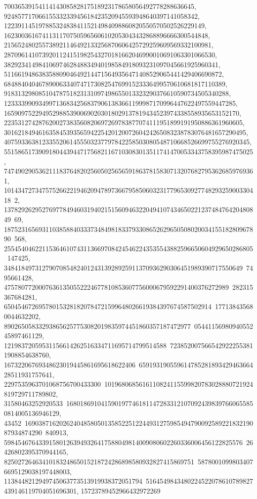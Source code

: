 {{{   7003653915411414308582817518923178658056492778288636645, 
   92485771706615533233945618423520945593948640397141058342, 
   1223911451978853248384115214984098860820550570502526229149, 
   16230036167411311707505965606102053043432868896666300544848, 
   215652480255738921146492133256870606425729259609569332100981, 
   2870961410739201124151982543270181662046990010691063301066530, 
   38292341498410697462848834940198584918093231097045661925960341, 
   511661948638358809046492144715649356471408529065441429406690872, 
   6848840404678900633407471730825476991523336499570610681817110389, 
   91831329808510478751823131097498655013323290376610590734505340288, 
   1233339909349971368342568379061383661199987170996447622497559447285, 
   16590975229495298853900690203018029137819434523974338558935653152170, 
   223531274287620027383560820697269783877074111951899191950886361960605, 
   3016218494616358453935659422542012007260424265083238783076481657290495, 
   40759336381233552061455503237797842258503080548710668526699755276920345, 
   551586517390918044394471756821167103083013511741470053343758395987475025, 
   7474902905362111837648202560502565659186378158307132076827953626859769361, 
   10143472734757526622194620947897366795850603231779653092774829325900330418\
2, 
   13782926295276977849460319402151560946322049410743465022123748476420480849\
69, 
   18752316569311038588403337348498183379330865262965050802003415518280967890\
568, 255454046221153646107431136697084245462243535543882596650604929650286805\
147425, 348418497312790708548240124313928925911370936290306451989390717550649\
7495661428, 47578077200076361350552224677810853607756000679592291400376272989\
282315367684281, 650454672695780153281820784721599648026619384397674587502914\
177138435680044632202, 890265058332938656257753082019835974451860357187472977\
0544115698094055245897461129, 12198372059531156614262516334711695714799514588\
7238520075665429222553811908854638760, 16732206769348623019445861695618622406\
65919319055961478528189342946366428511931757641, 2297535963701068756700433300\
1019680685616110824115599820783028880721924819729711789802, 31580463252920533\
1680186910415901977461811472833121070924398397660655850814005136946129, 43452\
16903871620262404858050135852251224493127598549479009258922183219087934874290\
840913, 598454676433915801263949326417588049814009080602260336006456122825576\
26426802395370944165, 8250272646341018324865015218724286898580932827415869751\
58780010998034076695129038197448003, 1138448212949745063773513919938372051794\
5164549843480224522078610789827439146119704051696301, 15723789452966432972269\
}}}
